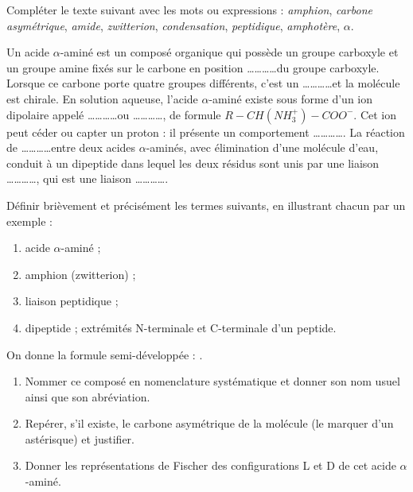 \documentclass[11pt]{article}
\newcounter{popsec}
\newcounter{popsub}
\newcommand{\courssub}[1]{%
  \stepcounter{popsub}%
  \par\vspace{9pt}\noindent{\popxbold\fontsize{11.5}{13}\selectfont\color{popink}{\color{poporange}\thepopsec.\thepopsub}\hspace{6pt}#1}\par\nopagebreak\vspace{4pt}
}
\begin{document}
\begin{exercice}
Compléter le texte suivant avec les mots ou expressions : \emph{amphion}, \emph{carbone asymétrique}, \emph{amide}, \emph{zwitterion}, \emph{condensation}, \emph{peptidique}, \emph{amphotère}, \emph{$\alpha$}.

Un acide $\alpha$-aminé est un composé organique qui possède un groupe carboxyle  et un groupe amine  fixés sur le carbone en position \ldots\ldots\ldots\ldots du groupe carboxyle. Lorsque ce carbone porte quatre groupes différents, c'est un \ldots\ldots\ldots\ldots et la molécule est chirale. En solution aqueuse, l'acide $\alpha$-aminé existe sous forme d'un ion dipolaire appelé \ldots\ldots\ldots\ldots ou \ldots\ldots\ldots\ldots, de formule $R-CH(NH_3^+)-COO^-$. Cet ion peut céder ou capter un proton : il présente un comportement \ldots\ldots\ldots\ldots. La réaction de \ldots\ldots\ldots\ldots entre deux acides $\alpha$-aminés, avec élimination d'une molécule d'eau, conduit à un dipeptide dans lequel les deux résidus sont unis par une liaison \ldots\ldots\ldots\ldots, qui est une liaison \ldots\ldots\ldots\ldots.
\end{exercice}

\begin{exercice}[Définitions]
Définir brièvement et précisément les termes suivants, en illustrant chacun par un exemple :
\begin{enumerate}
\item acide $\alpha$-aminé ;
\item amphion (zwitterion) ;
\item liaison peptidique ;
\item dipeptide ; extrémités N-terminale et C-terminale d'un peptide.
\end{enumerate}
\end{exercice}

\courssub{Je m'entraîne}

\begin{exercice}
On donne la formule semi-développée : .
\begin{enumerate}
\item Nommer ce composé en nomenclature systématique et donner son nom usuel ainsi que son abréviation.
\item Repérer, s'il existe, le carbone asymétrique de la molécule (le marquer d'un astérisque) et justifier.
\item Donner les représentations de Fischer des configurations L et D de cet acide $\alpha$-aminé.
\end{enumerate}
\end{exercice}
\end{document}
